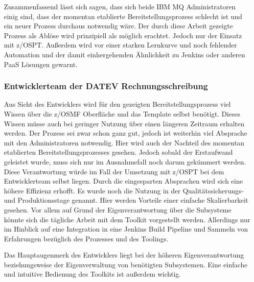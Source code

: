 Zusammenfassend lässt sich sagen, dass sich beide IBM MQ Administratoren einig sind, dass der momentan etablierte Bereitstellungsprozess schlecht ist und ein neuer Prozess durchaus notwendig wäre.
Der durch diese Arbeit gezeigte Prozess als Ablöse wird prinzipiell als möglich erachtet.
Jedoch nur der Einsatz mit z/OSPT.
Außerdem wird vor einer starken Lernkurve und noch fehlender Automation und der damit einhergehenden Ähnlichkeit zu Jenkins oder anderen PaaS Lösungen gewarnt.

\subsubsection{Entwicklerteam der DATEV Rechnungsschreibung}
Aus Sicht des Entwicklers wird für den gezeigten Bereitstellungsprozess viel Wissen über die z/OSMF Oberfläche und das Template selbst benötigt.
Dieses Wissen müsse auch bei geringer Nutzung über einen längeren Zeitraum erhalten werden.
Der Prozess sei zwar schon ganz gut, jedoch ist weiterhin viel Absprache mit den Administratoren notwendig.
Hier wird auch der Nachteil des momentan etablierten Bereitstellungsprozesses gesehen.
Jedoch sobald der Erstaufwand geleistet wurde, muss sich nur im Ausnahmefall noch darum gekümmert werden.
Diese Verantwortung würde im Fall der Umsetzung mit z/OSPT bei dem Entwicklerteam selbst liegen.
Durch die eingesparten Absprachen wird sich eine höhere Effizienz erhofft.
Es wurde noch die Nutzung in der Qualitätssicherungs- und Produktionsstage genannt.
Hier werden Vorteile einer einfache Skalierbarkeit gesehen.
Vor allem auf Grund der Eigenverantwortung über die Subsysteme könnte sich die tägliche Arbeit mit dem Toolkit vorgestellt werden.
Allerdings nur im Hinblick auf eine Integration in eine Jenkins Build Pipeline und Sammeln von Erfahrungen bezüglich des Prozesses und des Toolings.

Das Hauptaugenmerk des Entwicklers liegt bei der höheren Eigenverantwortung beziehungsweise der Eigenverwaltung von benötigten Subsystemen.
Eine einfache und intuitive Bedienung des Toolkits ist außerdem wichtig.

